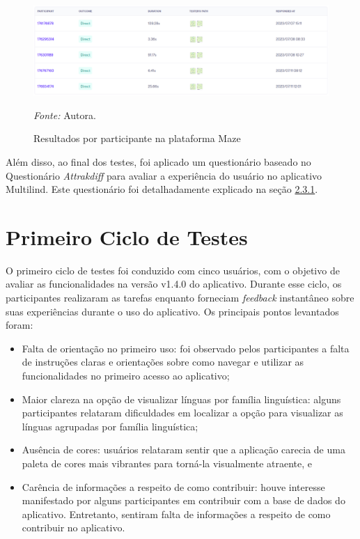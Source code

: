 \begin{figure}[h!]
	\centering
	\caption{Resultados por participante na plataforma Maze}
	\begin{adjustbox}{center}
		\includegraphics[width=1\textwidth]{figuras/maze2.eps}
	\end{adjustbox}
	\begin{tablenotes}[flushleft]
		\centering
		\item \textit{Fonte:} Autora.
	\end{tablenotes}
	\label{fig32}
\end{figure}

Além disso, ao final dos testes, foi aplicado um questionário baseado no Questionário \textit{Attrakdiff} para avaliar a experiência do usuário no aplicativo Multilind. Este questionário foi detalhadamente explicado na seção \hyperref[sec:Medicao2]{2.3.1}.

\section{Primeiro Ciclo de Testes}
\label{sec:Primeiro Ciclo}
O primeiro ciclo de testes foi conduzido com cinco usuários, com o objetivo de avaliar as funcionalidades na versão v1.4.0 do aplicativo. Durante esse ciclo, os participantes realizaram as tarefas enquanto forneciam \textit{feedback} instantâneo sobre suas experiências durante o uso 
do aplicativo. Os principais pontos levantados foram:

\begin{itemize}
	\item Falta de orientação no primeiro uso: foi observado pelos participantes a falta de instruções claras e orientações sobre como navegar e utilizar as funcionalidades no primeiro acesso ao aplicativo;
	\item Maior clareza na opção de visualizar línguas por família linguística: alguns participantes relataram dificuldades em localizar a opção para visualizar as línguas agrupadas por família linguística;
	\item Ausência de cores: usuários relataram sentir que a aplicação carecia de uma paleta de cores mais vibrantes para torná-la visualmente atraente, e
	\item Carência de informações a respeito de como contribuir: houve interesse manifestado por alguns participantes em contribuir com a base de dados do aplicativo. Entretanto, sentiram falta de informações a respeito 
	de como contribuir no aplicativo.
\end{itemize}

